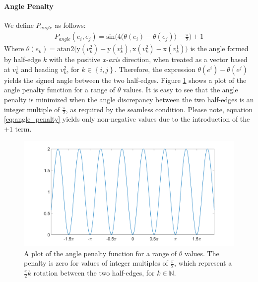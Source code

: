 \paragraph{Angle Penalty}
We define $P_{angle}$ as follows:
\begin{equation}\label{eq:angle_penalty}
\begin{split}
P_{angle}\left(e_i,e_j\right) = \mathrm{sin} \bigg( 4\Big(\theta\left(e_i\right) - \theta\left(e_j\right)\Big) - \frac{\pi}{2}\bigg) + 1
\end{split}
\end{equation}
Where $\theta\left(e_k\right) = \mathrm{atan2}\Big(\mathrm{y}\left(v_k^2\right) - \mathrm{y}\left(v_k^1\right), \mathrm{x}\left(v_k^2\right) - \mathrm{x}\left(v_k^1\right)\Big)$ is the angle formed by half-edge $k$ with the positive \emph{x-axis} direction, when treated as a vector based at $v_k^1$ and heading $v_k^2$, for $k \in \left\{i,j\right\}$. Therefore, the expression $\theta\left(e^i\right) - \theta\left(e^j\right)$ yields the signed angle between the two half-edges. Figure \ref{fig:angle_penalty} shows a plot of the angle penalty function for a range of $\theta$ values. It is easy to see that the angle penalty is minimized when the angle discrepancy between the two half-edges is an integer multiple of $\frac{\pi}{2}$, as required by the seamless condition. Please note, equation \ref{eq:angle_penalty} yields only non-negative values due to the introduction of the $+1$ term.
\begin{figure}[ht]
\centering
\includegraphics[width=15cm]{figures/seamless/angle_penalty_function.png}
\caption[The Angle Penalty Function]{A plot of the angle penalty function for a range of $\theta$ values. The penalty is zero for values of integer multiples of $\frac{\pi}{2}$, which represent a $\frac{\pi}{2}k$ rotation between the two half-edges, for $k \in \mathbb{N}$.}
\label{fig:angle_penalty}
\end{figure}
